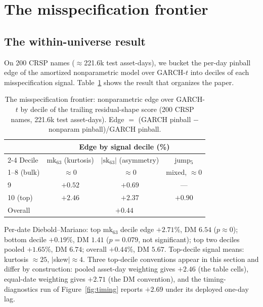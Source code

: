 \documentclass[11pt]{article}
\theoremstyle{remark}
\begin{document}
\section{The misspecification frontier}\label{sec:frontier}

\subsection{The within-universe result}

On 200 CRSP names ($\approx$221.6k test asset-days), we bucket the per-day
pinball edge of the amortized nonparametric model over GARCH-$t$ into
deciles of each misspecification signal.
Table~\ref{tab:frontier} shows the result that organizes the paper.

\begin{table}[t]
\centering
\begin{threeparttable}
\caption{The misspecification frontier: nonparametric edge over
GARCH-$t$ by decile of the trailing residual-shape score (200 CRSP
names, 221.6k test asset-days). Edge $=$ (GARCH pinball $-$ nonparam
pinball)/GARCH pinball.}
\label{tab:frontier}
\begin{tabular}{lccc}
\toprule
& \multicolumn{3}{c}{Edge by signal decile (\%)} \\
\cmidrule(lr){2-4}
Decile & $\mathrm{mk}_{63}$ (kurtosis) & $|\mathrm{sk}_{63}|$ (asymmetry) & jump$_5$ \\
\midrule
1--8 (bulk) & $\approx 0$ & $\approx 0$ & mixed, $\approx 0$ \\
9 & $+0.52$ & $+0.69$ & --- \\
10 (top) & $\mathbf{+2.46}$ & $\mathbf{+2.37}$ & $+0.90$ \\
\midrule
Overall & \multicolumn{3}{c}{$+0.44$} \\
\bottomrule
\end{tabular}
\begin{tablenotes}\footnotesize
\item Per-date Diebold--Mariano: top $\mathrm{mk}_{63}$ decile edge
$+2.71\%$, DM $6.54$ ($p \approx 0$); bottom decile $+0.19\%$, DM $1.41$
($p = 0.079$, not significant); top two deciles pooled $+1.65\%$, DM
$6.74$; overall $+0.44\%$, DM $5.67$. Top-decile signal means: kurtosis
$\approx 25$, $|$skew$| \approx 4$. Three top-decile conventions
appear in this section and differ by construction: pooled asset-day
weighting gives $+2.46$ (the table cells), equal-date weighting gives
$+2.71$ (the DM convention), and the timing-diagnostics run of
Figure~\ref{fig:timing} reports $+2.69$ under its deployed one-day
lag.
\end{tablenotes}
\end{threeparttable}
\end{table}
\end{document}
